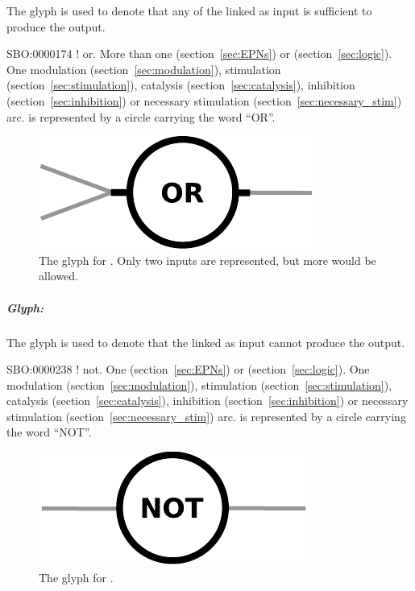 The glyph  is used to denote that any of the  linked as input is sufficient to produce the output.  

\begin{glyphDescription}
 \glyphSboTerm SBO:0000174 ! or.
 \glyphOrigin More than one  (section~\ref{sec:EPNs}) or  (section~\ref{sec:logic}).
 \glyphTarget  One modulation (section~\ref{sec:modulation}), stimulation (section~\ref{sec:stimulation}), catalysis (section~\ref{sec:catalysis}), inhibition (section~\ref{sec:inhibition}) or necessary stimulation (section~\ref{sec:necessary_stim}) arc.
 \glyphNode {} is represented by a circle carrying the word ``OR''.
 \end{glyphDescription}

\begin{figure}[H]
  \centering
  \includegraphics[scale = 0.5]{images/or}
  \caption{The \PD glyph for . Only two inputs are represented, but more would be allowed.}
  \label{fig:or}
\end{figure}


\subparagraph{Glyph: }\label{sec:not}

The glyph  is used to denote that the  linked as input cannot produce the output.  

\begin{glyphDescription}
 \glyphSboTerm SBO:0000238 ! not.
 \glyphOrigin One  (section~\ref{sec:EPNs}) or  (section~\ref{sec:logic}).
 \glyphTarget  One modulation (section~\ref{sec:modulation}), stimulation (section~\ref{sec:stimulation}), catalysis (section~\ref{sec:catalysis}), inhibition (section~\ref{sec:inhibition}) or necessary stimulation (section~\ref{sec:necessary_stim}) arc.
 \glyphNode {} is represented by a circle carrying the word ``NOT''.
 \end{glyphDescription}

\begin{figure}[H]
  \centering
  \includegraphics[scale = 0.5]{images/not}
  \caption{The \PD glyph for .}
  \label{fig:not}
\end{figure}


